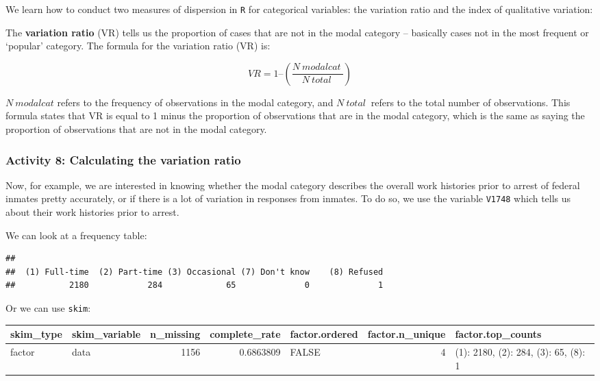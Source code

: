 \documentclass[
]{book}
\newenvironment{Shaded}{\begin{snugshade}}{\end{snugshade}}
\newcommand{\FunctionTok}[1]{\textcolor[rgb]{0.00,0.00,0.00}{#1}}
\newcommand{\NormalTok}[1]{#1}
\newcommand{\SpecialCharTok}[1]{\textcolor[rgb]{0.00,0.00,0.00}{#1}}
\begin{document}
We learn how to conduct two measures of dispersion in \texttt{R} for categorical variables: the variation ratio and the index of qualitative variation:

The \textbf{variation ratio} (VR) tells us the proportion of cases that are not in the modal category -- basically cases not in the most frequent or `popular' category. The formula for the variation ratio (VR) is:

\[VR = 1 – ({\frac {N~modalcat~} {N~total~}})\]

\(N~modalcat\) refers to the frequency of observations in the modal category, and \(N~total~\) refers to the total number of observations. This formula states that VR is equal to 1 minus the proportion of observations that are in the modal category, which is the same as saying the proportion of observations that are not in the modal category.

\hypertarget{activity-8-calculating-the-variation-ratio}{%
\subsubsection{Activity 8: Calculating the variation ratio}\label{activity-8-calculating-the-variation-ratio}}

Now, for example, we are interested in knowing whether the modal category describes the overall work histories prior to arrest of federal inmates pretty accurately, or if there is a lot of variation in responses from inmates. To do so, we use the variable \texttt{V1748} which tells us about their work histories prior to arrest.

We can look at a frequency table:

\begin{Shaded}
\end{Shaded}

\begin{verbatim}
## 
##  (1) Full-time  (2) Part-time (3) Occasional (7) Don't know    (8) Refused 
##           2180            284             65              0              1
\end{verbatim}

Or we can use \texttt{skim}:

\begin{tabular}{l|l|r|r|l|r|l}
\hline
skim\_type & skim\_variable & n\_missing & complete\_rate & factor.ordered & factor.n\_unique & factor.top\_counts\\
\hline
factor & data & 1156 & 0.6863809 & FALSE & 4 & (1): 2180, (2): 284, (3): 65, (8): 1\\
\hline
\end{tabular}
\end{document}
